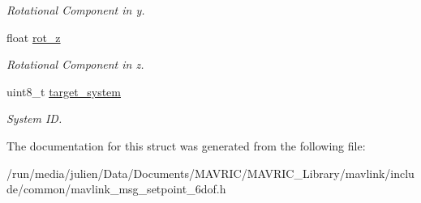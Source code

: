 \begin{DoxyCompactItemize}
\begin{DoxyCompactList}\small\item\em Rotational Component in y. \end{DoxyCompactList}\item 
\hypertarget{struct____mavlink__setpoint__6dof__t_a05b10938af551a11fcafb7e1f152427a}{float \hyperlink{struct____mavlink__setpoint__6dof__t_a05b10938af551a11fcafb7e1f152427a}{rot\+\_\+z}}\label{struct____mavlink__setpoint__6dof__t_a05b10938af551a11fcafb7e1f152427a}

\begin{DoxyCompactList}\small\item\em Rotational Component in z. \end{DoxyCompactList}\item 
\hypertarget{struct____mavlink__setpoint__6dof__t_aa2e3d9d663dcb5fb8eeae5aa504155a3}{uint8\+\_\+t \hyperlink{struct____mavlink__setpoint__6dof__t_aa2e3d9d663dcb5fb8eeae5aa504155a3}{target\+\_\+system}}\label{struct____mavlink__setpoint__6dof__t_aa2e3d9d663dcb5fb8eeae5aa504155a3}

\begin{DoxyCompactList}\small\item\em System I\+D. \end{DoxyCompactList}\end{DoxyCompactItemize}


The documentation for this struct was generated from the following file\+:\begin{DoxyCompactItemize}
\item 
/run/media/julien/\+Data/\+Documents/\+M\+A\+V\+R\+I\+C/\+M\+A\+V\+R\+I\+C\+\_\+\+Library/mavlink/include/common/mavlink\+\_\+msg\+\_\+setpoint\+\_\+6dof.\+h\end{DoxyCompactItemize}
